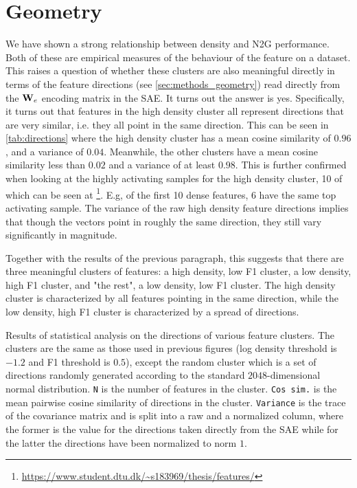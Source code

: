 \section{Geometry}
We have shown a strong relationship between density and \ac{N2G} performance.
Both of these are empirical measures of the behaviour of the feature on a dataset.
This raises a question of whether these clusters are also meaningful directly in terms of the feature directions (see \autoref{sec:methods_geometry}) read directly from the $\mathbf{W}_e$ encoding matrix in the SAE.
It turns out the answer is yes.
Specifically, it turns out that features in the high density cluster all represent directions that are very similar, i.e. they all point in the same direction.
This can be seen in \autoref{tab:directions} where the high density cluster has a mean cosine similarity of $0.96$, and a variance of $0.04$.
Meanwhile, the other clusters have a mean cosine similarity less than $0.02$ and a variance of at least $0.98$.
This is further confirmed when looking at the highly activating samples for the high density cluster, 10 of which can be seen at \footnote{\url{https://www.student.dtu.dk/~s183969/thesis/features/}}.
E.g, of the first 10 dense features, 6 have the same top activating sample.
The variance of the raw high density feature directions implies that though the vectors point in roughly the same direction, they still vary significantly in magnitude.

Together with the results of the previous paragraph, this suggests that there are three meaningful clusters of features: a high density, low F1 cluster, a low density, high F1 cluster, and "the rest", a low density, low F1 cluster.
The high density cluster is characterized by all features pointing in the same direction, while the low density, high F1 cluster is characterized by a spread of directions.

\begin{table}[ht]
    \centering
    
    \caption{Results of statistical analysis on the directions of various feature clusters.
    The clusters are the same as those used in previous figures (log density threshold is $-1.2$ and F1 threshold is $0.5$), except the random cluster which is a set of directions randomly generated according to the standard $2048$-dimensional normal distribution.
    \texttt N is the number of features in the cluster.
    \texttt{Cos sim.} is the mean pairwise cosine similarity of directions in the cluster.
    \texttt{Variance} is the trace of the covariance matrix and is split into a raw and a normalized column, where the former is the value for the directions taken directly from the \ac{SAE} while for the latter the directions have been normalized to norm $1$.
    }
    \label{tab:directions}
\end{table}

